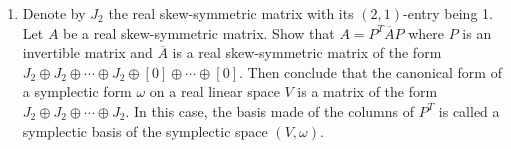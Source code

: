 \begin{problem}
\begin{enumerate}
	\item Denote by $J_2$ the real skew-symmetric matrix with its $(2, 1)$-entry being 1. Let $A$ be a real skew-symmetric matrix. Show that $A = P^T \overline{A} P$ where $P$ is an invertible matrix and $\overline{A}$ is a real skew-symmetric matrix of the form $J_2 \oplus J_2 \oplus \cdots \oplus J_2 \oplus [0] \oplus \cdots \oplus [0]$. Then conclude that the canonical form of a symplectic form $\omega$ on a real linear space $V$ is a matrix of the form $J_2 \oplus J_2 \oplus \cdots \oplus J_2$. In this case, the basis made of the columns of $P^T$ is called a symplectic basis of the symplectic space $(V, \omega)$.
\end{enumerate}
\end{problem}
